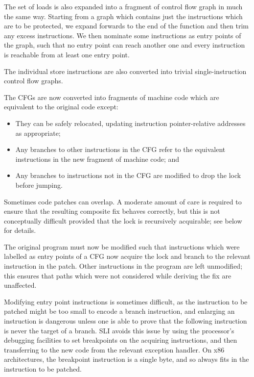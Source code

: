 \documentclass[10pt,letter,twocolumn]{sigplanconf}
\begin{document}
The set of loads is also expanded into a fragment of control flow
graph in much the same way.  Starting from a graph which contains just
the instructions which are to be protected, we expand forwards to the
end of the function and then trim any excess instructions.  We then
nominate some instructions as entry points of the graph, such that no
entry point can reach another one and every instruction is reachable
from at least one entry point.

The individual store instructions are also converted into trivial
single-instruction control flow graphs.

The CFGs are now converted into fragments of machine code which are
equivalent to the original code except:

\begin{itemize}
\item They can be safely relocated, updating instruction pointer-relative
  addresses as appropriate;
\item Any branches to other instructions in the CFG refer to the
  equivalent instructions in the new fragment of machine code; and
\item Any branches to instructions not in the CFG are modified to
  drop the lock before jumping.
\end{itemize}

\noindent
Sometimes code patches can overlap.  A moderate amount of care is
required to ensure that the resulting composite fix behaves correctly,
but this is not conceptually difficult provided that the lock is
recursively acquirable; see below for details.

The original program must now be modified such that instructions which
were labelled as entry points of a CFG now acquire the lock and branch
to the relevant instruction in the patch.  Other instructions in the
program are left unmodified; this ensures that paths which were not
considered while deriving the fix are unaffected.

Modifying entry point instructions is sometimes difficult, as the
instruction to be patched might be too small to encode a branch
instruction, and enlarging an instruction is dangerous unless one is
able to prove that the following instruction is never the target of a
branch.  SLI avoids this issue by using the processor's debugging
facilities to set breakpoints on the acquiring instructions, and then
transferring to the new code from the relevant exception handler.  On
x86 architectures, the breakpoint instruction is a single byte, and so
always fits in the instruction to be patched.
\end{document}
